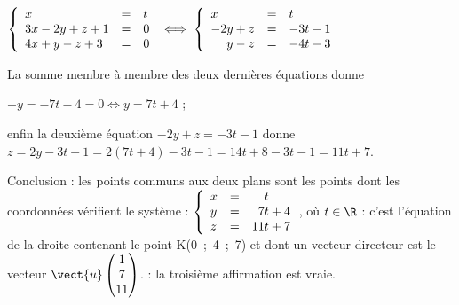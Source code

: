 \begin{enumerate}
\begin{enumerate}
$\left\{\begin{array}{l cl}
x&=&t\\
3x - 2y + z + 1 &=& 0\\
4x + y - z + 3 &=& 0
\end{array}\right. \iff \left\{\begin{array}{l cl}
x&=&t\\
-2y + z &=& - 3t - 1\\
\phantom{- 2}y - z &=& - 4t - 3
\end{array}\right. $

La somme membre à membre des deux dernières équations donne

$-y =- 7t - 4 = 0 \iff y = 7t + 4 $ ;

enfin la deuxième équation $-2y + z = - 3t - 1$ donne $z = 2y - 3t - 1 = 2(7t + 4) - 3t - 1 = 14t + 8 - 3t - 1 = 11t + 7$.
		\end{enumerate}


Conclusion : les points communs aux deux plans sont les points dont les coordonnées vérifient le système : $\left\{\begin{array}{l c l}
x&=& \phantom{17}t\\
y& =& \phantom{1}7t + 4 \\
z& =& 11t + 7
\end{array}\right.$, où $t \in \R$ : c'est l'équation de la droite contenant le point K(0~;~4~;~7) et dont un vecteur directeur est le vecteur $\vect{u}\begin{pmatrix} 1\\7\\11\end{pmatrix}$. : la troisième affirmation est vraie.
\end{enumerate}

\vspace{0,5cm}

